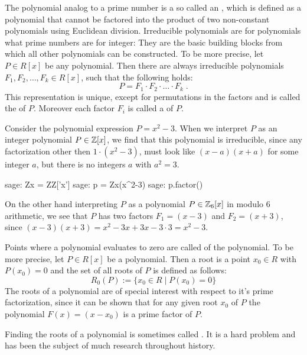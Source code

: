 The polynomial analog to a prime number is a so called an , which is defined as a polynomial that cannot be factored into the product of two non-constant polynomials using Euclidean division. Irreducible polynomials are for polynomials what prime numbers are for integer: They are the basic building blocks from which all other polynomials can be constructed. To be more precise, let $P \in R[x]$ be any polynomial. Then there are always irreducible polynomials $F_1, F_2, \ldots, F_k \in R[x]$, such that the following holds:
\begin{equation}
\label{def_polynomial_prime_factorization}
P = F_1 \cdot F_2 \cdot \ldots \cdot F_k \;.
\end{equation}
This representation is unique, except for permutations in the factors and is called the  of $P$. Moreover each factor $F_i$ is called a  of $P$.
\begin{example}
\label{example:irreducible_integer_polynomial_1}
 Consider the polynomial expression $P=x^2-3$. When we interpret $P$ as an integer polynomial $P\in\mathbb{Z}[x]$, we find that this polynomial is irreducible, since any factorization other then $1\cdot(x^2-3)$, must look like $(x-a)(x+a)$ for some integer $a$, but there is no integers $a$ with $a^2=3$.
\begin{sagecommandline}
sage: Zx = ZZ['x']
sage: p = Zx(x^2-3)
sage: p.factor()
\end{sagecommandline}
On the other hand interpreting $P$ as a polynomial $P\in \mathbb{Z}_6[x]$ in modulo $6$ arithmetic, we see that $P$ has two factors $F_1=(x-3)$ and $F_2=(x+3)$, since
$(x-3)(x+3)= x^2 -3x +3x -3\cdot 3= x^2-3$.
\end{example}
Points where a polynomial evaluates to zero are called  of the polynomial. To be more precise, let $P\in R[x]$ be a polynomial. Then a root is a point $x_0\in R$ with $P(x_0)=0$ and the set of all roots of $P$ is defined as follows:
\begin{equation}
R_0(P):=\{x_0\in R\;|\; P(x_0)=0\}
\end{equation}
The roots of a polynomial are of special interest with respect to it's prime factorization, since it can be shown that for any given root $x_0$ of $P$ the polynomial $F(x)=(x-x_0)$ is a prime factor of $P$.

Finding the roots of a polynomial is sometimes called . It is a hard problem and has been the subject of much research throughout history.

